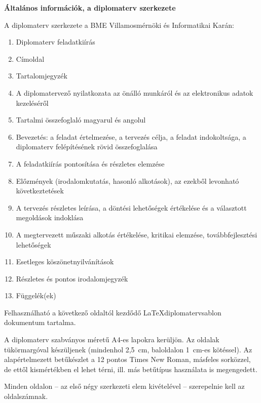 \selecthungarian

\footnotesize
\begin{center}
\large
\textbf{\Large Általános információk, a diplomaterv szerkezete}\\
\end{center}

A diplomaterv szerkezete a BME Villamosmérnöki és Informatikai Karán:
\begin{enumerate}
\item	Diplomaterv feladatkiírás
\item	Címoldal
\item	Tartalomjegyzék
\item	A diplomatervező nyilatkozata az önálló munkáról és az elektronikus adatok kezeléséről
\item	Tartalmi összefoglaló magyarul és angolul
\item	Bevezetés: a feladat értelmezése, a tervezés célja, a feladat indokoltsága, a diplomaterv felépítésének rövid összefoglalása
\item	A feladatkiírás pontosítása és részletes elemzése
\item	Előzmények (irodalomkutatás, hasonló alkotások), az ezekből levonható következtetések
\item	A tervezés részletes leírása, a döntési lehetőségek értékelése és a választott megoldások indoklása
\item	A megtervezett műszaki alkotás értékelése, kritikai elemzése, továbbfejlesztési lehetőségek
\item	Esetleges köszönetnyilvánítások
\item	Részletes és pontos irodalomjegyzék
\item	Függelék(ek)
\end{enumerate}

Felhasználható a következő oldaltól kezdődő \LaTeX diplomatervsablon dokumentum tartalma. 

A diplomaterv szabványos méretű A4-es lapokra kerüljön. Az oldalak tükörmargóval készüljenek (mindenhol 2,5~cm, baloldalon 1~cm-es kötéssel). Az alapértelmezett betűkészlet a 12 pontos Times New Roman, másfeles sorközzel, de ettől kismértékben el lehet térni, ill. más betűtípus használata is megengedett.

Minden oldalon -- az első négy szerkezeti elem kivételével -- szerepelnie kell az oldalszámnak.

